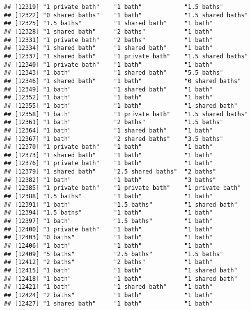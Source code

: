 \documentclass[
]{article}
\begin{document}
\begin{verbatim}
## [12319] "1 private bath"    "1 bath"            "1.5 baths"        
## [12322] "0 shared baths"    "1 bath"            "1.5 shared baths" 
## [12325] "1.5 baths"         "1 shared bath"     "1 bath"           
## [12328] "1 shared bath"     "2 baths"           "1 bath"           
## [12331] "1 private bath"    "2 baths"           "1 bath"           
## [12334] "1 shared bath"     "1 shared bath"     "1 bath"           
## [12337] "1 shared bath"     "1 private bath"    "1.5 shared baths" 
## [12340] "1 private bath"    "1 bath"            "1 bath"           
## [12343] "1 bath"            "1 shared bath"     "5.5 baths"        
## [12346] "1 shared bath"     "1 bath"            "0 shared baths"   
## [12349] "1 bath"            "1 shared bath"     "1 bath"           
## [12352] "1 bath"            "1 bath"            "1 bath"           
## [12355] "1 bath"            "1 bath"            "1 shared bath"    
## [12358] "1 bath"            "1 private bath"    "1.5 shared baths" 
## [12361] "1 bath"            "2 baths"           "1.5 baths"        
## [12364] "1 bath"            "1 shared bath"     "1 bath"           
## [12367] "1 bath"            "2 shared baths"    "3.5 baths"        
## [12370] "1 private bath"    "1 bath"            "1 bath"           
## [12373] "1 shared bath"     "1 bath"            "1 bath"           
## [12376] "1 private bath"    "1 bath"            "1 bath"           
## [12379] "1 shared bath"     "2.5 shared baths"  "2 baths"          
## [12382] "1 bath"            "1 bath"            "3 baths"          
## [12385] "1 private bath"    "1 private bath"    "1 private bath"   
## [12388] "1.5 baths"         "1 bath"            "1 bath"           
## [12391] "1 bath"            "1.5 baths"         "1 shared bath"    
## [12394] "1.5 baths"         "1 bath"            "1 bath"           
## [12397] "1 bath"            "1.5 baths"         "1 bath"           
## [12400] "1 private bath"    "1 bath"            "1 bath"           
## [12403] "0 baths"           "1 bath"            "1 bath"           
## [12406] "1 bath"            "1 bath"            "1 bath"           
## [12409] "5 baths"           "2.5 baths"         "1.5 baths"        
## [12412] "2 baths"           "2 baths"           "1 bath"           
## [12415] "1 bath"            "1 bath"            "1 shared bath"    
## [12418] "1 bath"            "1 bath"            "1 shared bath"    
## [12421] "1 bath"            "1 shared bath"     "1 bath"           
## [12424] "2 baths"           "1 bath"            "1 bath"           
## [12427] "1 shared bath"     "1 bath"            "1 bath"           

\end{verbatim}
\end{document}
